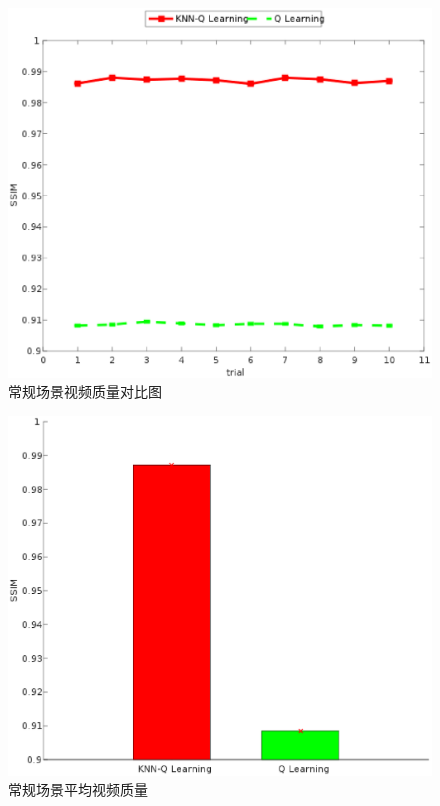 \documentclass[twocolumn]{article}
\begin{document}
\begin{figure}[htbp]
\centering
\includegraphics[width=\columnwidth]{regular_ssim_compare}
\caption{常规场景视频质量对比图}
\label{regular_ssim_compare}
\end{figure}
\begin{figure}[htbp]
\centering
\includegraphics[width=\columnwidth]{regular_ssim_bar_graph}
\caption{常规场景平均视频质量}
\label{regular_ssim_bar_graph}
\end{figure}
\end{document}

